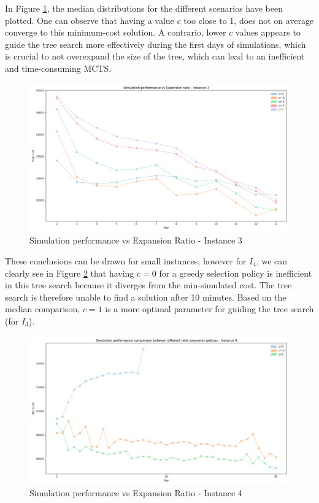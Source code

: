 In Figure \ref{fig:sim_perf_vs_c_3}, the median distributions for the different scenarios have been plotted. One can observe that having a value $c$ too close to 1, does not on average converge to this minimum-cost solution. A contrario, lower $c$ values appears to guide the tree search more effectively during the first days of simulations, which is crucial to not overexpand the size of the tree, which can lead to an inefficient and time-consuming MCTS.
\begin{figure}[!ht]
    \centering
    \includegraphics[width=\textwidth]{Figures/3 - Simulation performance vs Expansion ratio.png}
    \caption{Simulation performance vs Expansion Ratio - Instance 3}
    \label{fig:sim_perf_vs_c_3}
\end{figure}

These conclusions can be drawn for small instances, however for $I_4$, we can clearly see in Figure \ref{fig:sim_perf_vs_c_4} that having $c=0$ for a greedy selection policy is inefficient in this tree search because it diverges from the min-simulated cost. The tree search is therefore unable to find a solution after 10 minutes. Based on the median comparison, $c=1$ is a more optimal parameter for guiding the tree search (for $I_3$).
\begin{figure}[!ht]
    \centering
    \includegraphics[width=\textwidth]{Figures/4 - Simulation performance vs Expansion ratio.png}
    \caption{Simulation performance vs Expansion Ratio - Instance 4}
    \label{fig:sim_perf_vs_c_4}
\end{figure}

